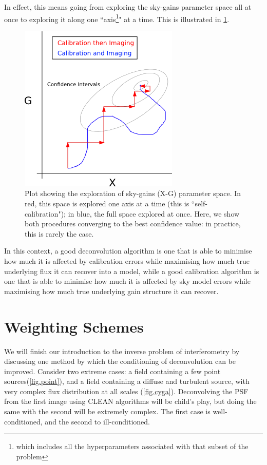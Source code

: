 \pg
In effect, this means going from exploring the sky-gains parameter space all at once to exploring it along one ``axis\footnote{which includes all the hyperparameters associated with that subset of the problem}" at a time. This is illustrated in \cref{fig.selfcal.paramexplore}. 
\begin{figure}[h!]
\includegraphics[width=.6\linewidth]{images/Selfcal-paramExplore.png}
\caption{\label{fig.selfcal.paramexplore} Plot showing the exploration of sky-gains (X-G) parameter space. In red, this space is explored one axis at a time (this is ``self-calibration"); in blue, the full space explored at once. Here, we show both procedures converging to the best confidence value: in practice, this is rarely the case.}
\end{figure}

\pg
In this context, a good deconvolution algorithm is one that is able to minimise how much it is affected by calibration errors while maximising how much true underlying flux it can recover into a model, while a good calibration algorithm is one that is able to minimise how much it is affected by sky model errors while maximising how much true underlying gain structure it can recover.



\section{Weighting Schemes}
\pg
We will finish our introduction to the inverse problem of interferometry by discussing one method by which the conditioning of deconvolution can be improved. Consider two extreme cases: a field containing a few point sources(\cref{fig.point}), and a field containing a diffuse and turbulent source, with very complex flux distribution at all scales (\cref{fig.cyga}). Deconvolving the PSF from the first image using CLEAN algorithms will be child's play, but doing the same with the second will be extremely complex. The first case is well-conditioned, and the second to ill-conditioned.

